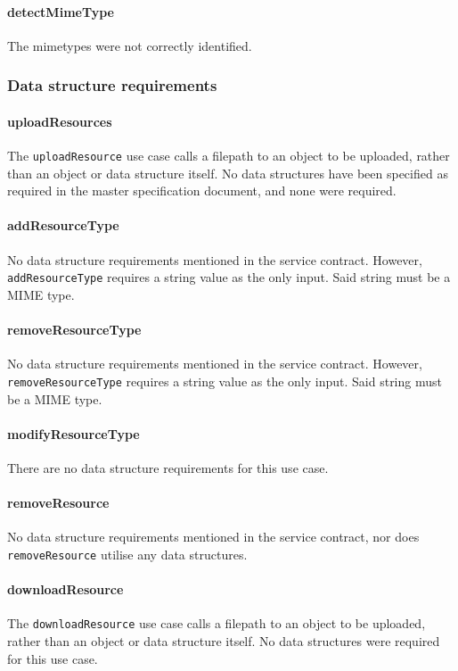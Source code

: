 \documentclass[a4paper]{article}
\begin{document}
\paragraph{detectMimeType}
The mimetypes were not correctly identified.

\subsubsection {Data structure requirements}

\paragraph{uploadResources}
The \texttt{uploadResource} use case calls a filepath to an object to be uploaded, rather than an object or data structure itself. No data structures have been specified as required in the master specification document, and none were required.

\paragraph{addResourceType}
No data structure requirements mentioned in the service contract. However, \texttt{addResourceType} requires a string value as the only input. Said string must be a MIME type.

\paragraph{removeResourceType}
No data structure requirements mentioned in the service contract. However, \texttt{removeResourceType} requires a string value as the only input. Said string must be a MIME type.

\paragraph{modifyResourceType}
There are no data structure requirements for this use case.

\paragraph{removeResource}
No data structure requirements mentioned in the service contract, nor does \texttt{removeResource} utilise any data structures.

\paragraph{downloadResource}
The \texttt{downloadResource} use case calls a filepath to an object to be uploaded, rather than an object or data structure itself. No data structures were required for this use case.
\end{document}
